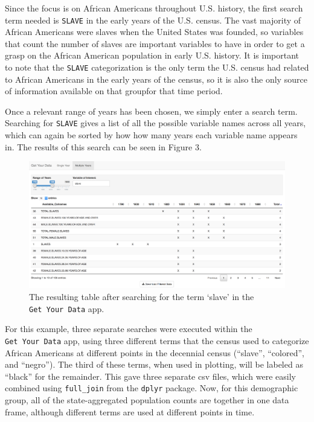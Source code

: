 \documentclass[11pt,]{article}
\begin{document}
Since the focus is on African Americans throughout U.S. history, the
first search term needed is \texttt{SLAVE} in the early years of the
U.S. census. The vast majority of African Americans were slaves when the
United States was founded, so variables that count the number of slaves
are important variables to have in order to get a grasp on the African
American population in early U.S. history. It is important to note that
the \texttt{SLAVE} categorization is the only term the U.S. census had
related to African Americans in the early years of the census, so it is
also the only source of information available on that groupfor that time
period.

Once a relevant range of years has been chosen, we simply enter a search
term. Searching for \texttt{SLAVE} gives a list of all the possible
variable names across all years, which can again be sorted by how how
many years each variable name appears in. The results of this search can
be seen in Figure 3.

\begin{figure}[htbp]
\centering
\includegraphics{./figures/app-sshot-slave.png}
\caption{The resulting table after searching for the term `slave' in the
\texttt{Get\ Your\ Data} app.}
\end{figure}

For this example, three separate searches were executed within the
\texttt{Get\ Your\ Data} app, using three different terms that the
census used to categorize African Americans at different points in the
decennial census (``slave'', ``colored'', and ``negro''). The third of
these terms, when used in plotting, will be labeled as ``black'' for the
remainder. This gave three separate csv files, which were easily
combined using \texttt{full\_join} from the \texttt{dplyr} package. Now,
for this demographic group, all of the state-aggregated population
counts are together in one data frame, although different terms are used
at different points in time.
\end{document}
